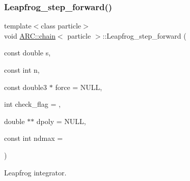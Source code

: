 \subsubsection{\texorpdfstring{Leapfrog\+\_\+step\+\_\+forward()}{Leapfrog\_step\_forward()}}
{\footnotesize\ttfamily template$<$class particle$>$ \\
void \hyperlink{classARC_1_1chain}{A\+R\+C\+::chain}$<$ particle $>$\+::Leapfrog\+\_\+step\+\_\+forward (\begin{DoxyParamCaption}\item[{const double}]{s,  }\item[{const int}]{n,  }\item[{const double3 $\ast$}]{force = {\ttfamily NULL},  }\item[{int}]{check\+\_\+flag = {},  }\item[{double $\ast$$\ast$}]{dpoly = {\ttfamily NULL},  }\item[{const int}]{ndmax = {} }\end{DoxyParamCaption})\hspace{0.3cm}{\ttfamily [inline]}}



Leapfrog integrator. 

